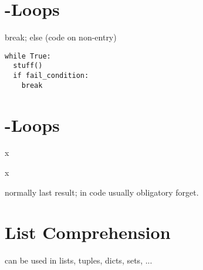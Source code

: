 \section{-Loops}
break; else (code on non-entry)

\begin{hintbox}
\begin{verbatim}
while True:
  stuff()
  if fail_condition:
    break
\end{verbatim}
\end{hintbox}

    
\section{-Loops}
\begin{hintbox}
x
\end{hintbox}

\begin{hintbox}
x
\end{hintbox}

\begin{hintbox}[Underscore]
normally last result; in code usually obligatory forget.
\end{hintbox}

\section{List Comprehension}
can be used in lists, tuples, dicts, sets, ...